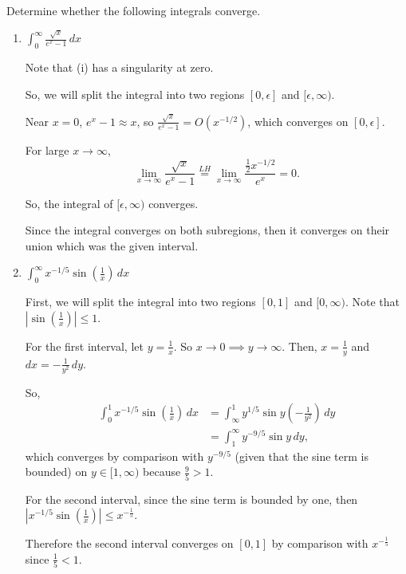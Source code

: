 \documentclass[../hw1]{subfiles}
\begin{document}
\begin{problem}[3]
Determine whether the following integrals converge.
\begin{enumerate}[label=\roman*)]
	\item $\int_{0}^{\infty} \frac{\sqrt{x} }{e^x-1} \,dx$

	      Note that (i) has a singularity at zero.

	      So, we will split the integral into two regions $[0,\epsilon]$ and $[\epsilon,\infty)$.

	      Near $x=0$,  $e^x-1 \approx x$, so  $\frac{\sqrt{x} }{e^x-1} = O(x^{-1 / 2})$, which converges on $[0,\epsilon]$.

	      For large  $x\to \infty$, \[
		      \lim_{x \to \infty} \frac{\sqrt{x}}{e^x-1} \overset{LH}{=} \lim_{x \to \infty} \frac{\frac{1}{2}x^{-1 / 2}}{e^x} = 0
		      .\]

	      So, the integral of $[\epsilon, \infty)$ converges.

	      Since the integral converges on both subregions, then it converges on their union which was the given interval.


	\item $\int_{0}^{\infty} x^{-1 / 5}\sin{(\frac{1}{x})}  \,dx$

	      First, we will split the integral into two regions $[0,1]$ and $[0,\infty)$.
	      Note that $|\sin{(\frac{1}{x})}|\le 1 $.

	      For the first interval, let $y=\frac{1}{x}$. So $x\to 0 \implies y\to \infty$.
	      Then, $x=\frac{1}{y}$ and $dx = -\frac{1}{y^2}\,dy$.

	      So,
	      \begin{align*}
		      \int_{0}^{1} x^{- 1 / 5}\sin{(\frac{1}{x})}  \,dx & = \int_{\infty}^{1} y^{1 / 5}\sin{y} (-\frac{1}{y^2})  \,dy \\
		                                                        & = \int_{1}^{\infty} y^{-9 / 5}\sin{y} \,dy
		      ,\end{align*}
	      which converges by comparison with $y^{- 9 / 5}$ (given that the sine term is bounded) on $y \in [1,\infty)$ because $\frac{9}{5}>1$.

	      For the second interval,
	      since the sine term is bounded by one,
	      then $|x^{-1 / 5}\sin{(\frac{1}{x})}| \le x^{-\frac{1}{5}}$.

	      Therefore the second interval converges on $[0,1]$ by comparison with  $x^{-\frac{1}{5}}$ since $\frac{1}{5}<1$.


\end{enumerate}
\end{problem}
\end{document}
